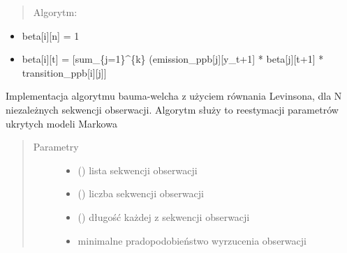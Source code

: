 \documentclass[letterpaper,10pt,polish]{sphinxmanual}
\begin{document}
\begin{fulllineitems}
\begin{fulllineitems}
\begin{quote}
Algorytm:
\end{quote}
\begin{itemize}
\item {} 
beta{[}i{]}{[}n{]} = 1

\item {} 
beta{[}i{]}{[}t{]} = {[}sum\_\{j=1\}\textasciicircum{}\{k\} (emission\_ppb{[}j{]}{[}y\_t+1{]} * beta{[}j{]}{[}t+1{]} * transition\_ppb{[}i{]}{[}j{]}{]}

\end{itemize}

\end{fulllineitems}


\begin{fulllineitems}
\label{\detokenize{HMM:HMM.HMM.baum_welch_algorithm}}
Implementacja algorytmu bauma-welcha z użyciem równania Levinsona, dla N niezależnych sekwencji obserwacji.
Algorytm służy to reestymacji parametrów ukrytych modeli Markowa
\begin{quote}\begin{description}
\item[{Parametry}] \leavevmode\begin{itemize}
\item {} 
 () \textendash{} lista sekwencji obserwacji

\item {} 
 () \textendash{} liczba sekwencji obserwacji

\item {} 
 () \textendash{} długość każdej z sekwencji obserwacji

\item {} 
 \textendash{} minimalne pradopodobieństwo wyrzucenia obserwacji

\end{itemize}

\end{description}\end{quote}

\end{fulllineitems}


\end{fulllineitems}
\end{document}
